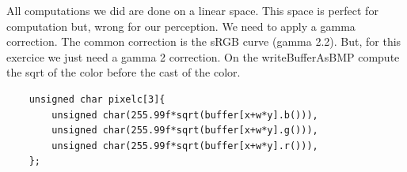 \documentclass{article}
\begin{document}
All computations we did are done on a linear space. This space is perfect for computation but, wrong for our perception. We need to apply a gamma correction. The common correction is the sRGB curve (gamma 2.2). But, for this exercice we just need a gamma 2 correction. On the writeBufferAsBMP compute the sqrt of the color before the cast of the color.
\begin{lstlisting}
	unsigned char pixelc[3]{
		unsigned char(255.99f*sqrt(buffer[x+w*y].b())),
		unsigned char(255.99f*sqrt(buffer[x+w*y].g())),
		unsigned char(255.99f*sqrt(buffer[x+w*y].r())),
	};
\end{lstlisting}
\end{document}
